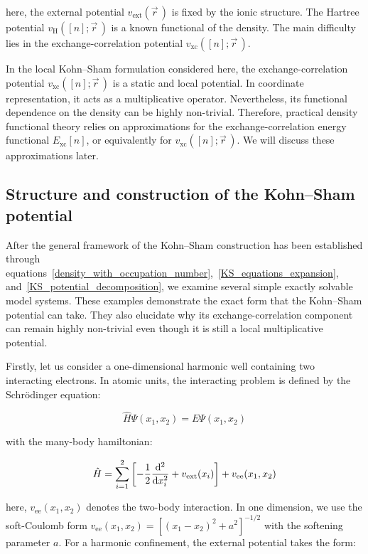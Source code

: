 here, the external potential $v_\mathrm{ext}(\vec{r}\,)$ is fixed by the ionic structure.
The Hartree potential $v_\mathrm{H}([n];\vec{r}\,)$ is a known functional of the density.
The main difficulty lies in the exchange-correlation potential $v_\mathrm{xc}([n];\vec{r}\,)$.

In the local Kohn--Sham formulation considered here, the exchange-correlation potential $v_\mathrm{xc}([n];\vec{r}\,)$ is a static and local potential.
In coordinate representation, it acts as a multiplicative operator.
Nevertheless, its functional dependence on the density can be highly non-trivial.
Therefore, practical density functional theory relies on approximations for the exchange-correlation energy functional $E_\mathrm{xc}[n]$,
or equivalently for $v_\mathrm{xc}([n];\vec{r}\,)$.
We will discuss these approximations later.

\FloatBarrier
\subsection{Structure and construction of the Kohn--Sham potential}

After the general framework of the Kohn--Sham construction has been established through equations~\eqref{density_with_occupation_number},~\eqref{KS_equations_expansion}, and~\eqref{KS_potential_decomposition},
we examine several simple exactly solvable model systems.
These examples demonstrate the exact form that the Kohn--Sham potential can take.
They also elucidate why its exchange-correlation component can remain highly non-trivial even though it is still a local multiplicative potential.

Firstly, let us consider a one-dimensional harmonic well containing two interacting electrons.
In atomic units, the interacting problem is defined by the Schrödinger equation:

\begin{equation}
    \hat{H}\Psi(x_1,x_2)=E\Psi(x_1,x_2)
\label{interacting_Schrodinger_equation_1D_two_electrons}
\end{equation}

with the many-body hamiltonian:

\begin{equation}
    \hat{H}
    = \sum_{i=1}^{2}\left[-\frac{1}{2}\frac{\mathrm{d}^2}{\mathrm{d} x_i^2}+v_\mathrm{ext}(x_i)\right]
    + v_\mathrm{ee}(x_1,x_2)
\label{interacting_hamiltonian_1D_two_electrons}
\end{equation}

here, $v_\mathrm{ee}(x_1,x_2)$ denotes the two-body interaction.
In one dimension, we use the soft-Coulomb form $v_\mathrm{ee}(x_1,x_2)=\left[(x_1-x_2)^2+a^2\right]^{-1/2}$ with the softening parameter $a$.
For a harmonic confinement, the external potential takes the form:

